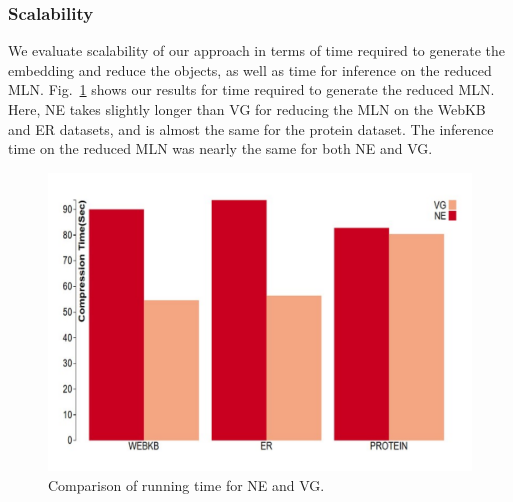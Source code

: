 \subsubsection{Scalability}

 We evaluate scalability of our approach in terms of time required to generate the embedding and reduce the objects, as well as time for inference on the reduced MLN. Fig.~\ref{fig:time} shows our results for time required to generate the reduced MLN. Here, NE takes slightly longer than VG for reducing the MLN on the WebKB and ER datasets, and is almost the same for the protein dataset. The inference time on the reduced MLN was nearly the same for both NE and VG.
\begin{figure}
  \centering
\includegraphics[scale=0.40]{compress_time.pdf}
\caption{\small{\label{fig:time} Comparison of running time for NE and VG.}}
\end{figure}

